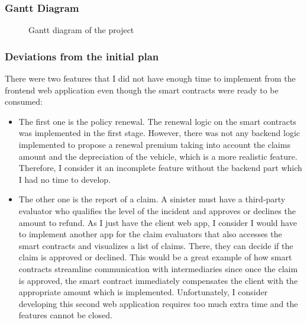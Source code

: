 {\subsubsection{Gantt Diagram}
\label{ssec:gantt}
\begin{figure}[H]
    \centering
    
    \caption[Project's Gantt diagram]{\footnotesize{Gantt diagram of the project}}
    \label{fig:gantt}
\end{figure}

\bigskip
\subsubsection{Deviations from the initial plan}
There were two features that I did not have enough time to implement from the frontend web application even though the smart contracts were ready to be consumed:
\begin{itemize}
    \item The first one is the policy renewal. The renewal logic on the smart contracts was implemented in the first stage. However, there was not any backend logic implemented to propose a renewal premium taking into account the claims amount and the depreciation of the vehicle, which is a more realistic feature. Therefore, I consider it an incomplete feature without the backend part which I had no time to develop.
    \item The other one is the report of a claim. A sinister must have a third-party evaluator who qualifies the level of the incident and approves or declines the amount to refund. As I just have the client web app, I consider I would have to implement another app for the claim evaluators that also accesses the smart contracts and visualizes a list of claims. There, they can decide if the claim is approved or declined. This would be a great example of how smart contracts streamline communication with intermediaries since once the claim is approved, the smart contract immediately compensates the client with the appropriate amount which is implemented. Unfortunately, I consider developing this second web application requires too much extra time and the features cannot be closed.
\end{itemize}}